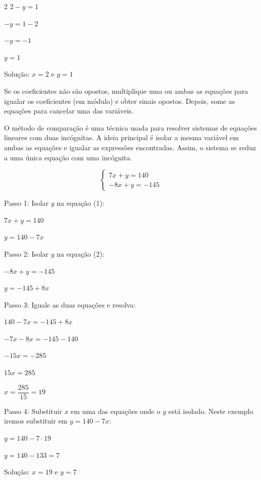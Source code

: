 \documentclass[12pt]{article}
\begin{document}
\begin{multicols}{2}
$2 - y = 1 $

$-y = 1 -2 $

$-y = -1 $

$y = 1$

Solução: $x = 2$ e $y = 1$

Se os coeficientes não são opostos, multiplique uma ou ambas as equações para igualar os coeficientes (em módulo) e obter sinais opostos. Depois, some as equações para cancelar uma das variáveis.





O método de comparação é uma técnica usada para resolver sistemas de equações lineares com duas incógnitas. A ideia principal é isolar a mesma variável em ambas as equações e igualar as expressões encontradas. Assim, o sistema se reduz a uma única equação com uma incógnita.


$$
\begin{cases}7x +y = 140  \\-8x +y = -145 \end{cases}
$$

Passo 1: Isolar $y$ na equação (1):

$7x +y = 140 $

$y =140 -7x$

Passo 2: Isolar $y$ na equação (2):

$-8x +y = -145 $

$y =-145 +8x$

Passo 3: Iguale as duas equações e resolva:

$140 -7x = -145 +8x$

$-7x -8x = -145 -140 $

$-15x = -285$

$15x = 285$
\vspace{10px}

$x = \dfrac{285}{15} =19$
\vspace{10px}

Passo 4: Substituir $x$ em uma das equações onde o $y$ está isolado. Neste exemplo iremos substituir em $y =140 -7x$:

$y =140 -7 \cdot 19$

$y =140 -133 = 7$

Solução: $x = 19$ e $y = 7$



\end{multicols}

\end{document}
